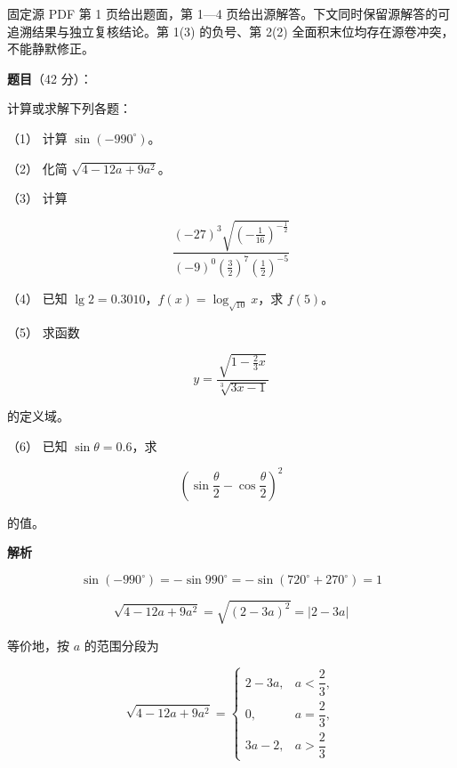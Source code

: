 

\begin{gktip}
固定源 PDF 第 1 页给出题面，第 1—4 页给出源解答。下文同时保留源解答的可追溯结果与独立复核结论。第 1(3) 的负号、第 2(2) 全面积末位均存在源卷冲突，不能静默修正。
\end{gktip}

\begin{answer}

\textbf{题目}（42 分）：

计算或求解下列各题：

（1） 计算 $\sin(-990^\circ)$。

（2） 化简 $\sqrt{4-12a+9a^2}$。

（3） 计算

\nopagebreak[4]
\[
\frac{(-27)^3\sqrt{\left(-\frac{1}{16}\right)^{-\frac12}}}
{(-9)^0\left(\frac32\right)^7\left(\frac12\right)^{-5}}
\]

（4） 已知 $\lg2=0.3010$，$f(x)=\log_{\sqrt{10}}x$，求 $f(5)$。

（5） 求函数

\nopagebreak[4]
\[
y=\frac{\sqrt{1-\frac23x}}{\sqrt[3]{3x-1}}
\]

的定义域。

（6） 已知 $\sin\theta=0.6$，求

\nopagebreak[4]
\[
\left(\sin\frac\theta2-\cos\frac\theta2\right)^2
\]

的值。

\textbf{解析}


\nopagebreak[4]
\[
\sin(-990^\circ)=-\sin990^\circ=-\sin(720^\circ+270^\circ)=1
\]


\nopagebreak[4]
\[
\sqrt{4-12a+9a^2}=\sqrt{(2-3a)^2}=\lvert2-3a\rvert
\]

等价地，按 $a$ 的范围分段为

\nopagebreak[4]
\[
\sqrt{4-12a+9a^2}=\begin{cases}
2-3a,&a<\dfrac23,\\
0,&a=\dfrac23,\\
3a-2,&a>\dfrac23
\end{cases}
\]


\end{answer}
